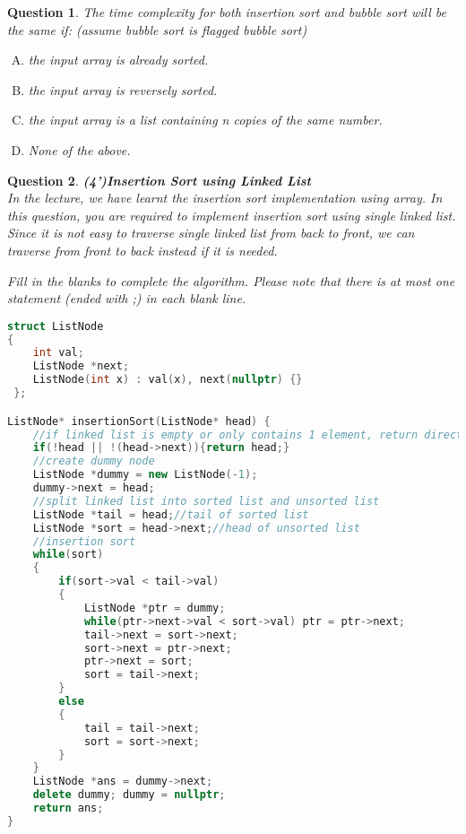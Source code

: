 \documentclass[10.5pt]{article}
\newtheorem{Q}{Question}
\begin{document}
	\begin{Q}
		The time complexity for both insertion sort and bubble sort will be the same if: (assume bubble sort is flagged bubble sort)
		\begin{enumerate}[(A)]
			\item the input array is already sorted.
			\item the input array is reversely sorted.
			\item the input array is a list containing n copies of the same number.
			\item None of the above.
		\end{enumerate}
	\end{Q}
	\vspace{6cm}
	\begin{Q}\textbf{(4')Insertion Sort using Linked List}\\
		 In the lecture, we have learnt the insertion sort implementation using array. In this question, you are required to implement insertion sort using single linked list. Since it is not easy to traverse single linked list from back to front, we can traverse from front to back instead if it is needed.
		 
		 Fill in the blanks to complete the algorithm. Please note that there is at most one statement (ended with ;) in each blank line. 
		 
\hrulefill
\rm{
\begin{lstlisting}[language=C++]
struct ListNode 
{
    int val;
 	ListNode *next;
 	ListNode(int x) : val(x), next(nullptr) {}
 };

ListNode* insertionSort(ListNode* head) {
    //if linked list is empty or only contains 1 element, return directly
    if(!head || !(head->next)){return head;}
    //create dummy node
    ListNode *dummy = new ListNode(-1);
    dummy->next = head;
    //split linked list into sorted list and unsorted list
    ListNode *tail = head;//tail of sorted list
    ListNode *sort = head->next;//head of unsorted list
    //insertion sort
    while(sort)
    {
        if(sort->val < tail->val)
        {
            ListNode *ptr = dummy;
            while(ptr->next->val < sort->val) ptr = ptr->next;
            tail->next = sort->next;
            sort->next = ptr->next;
            ptr->next = sort;
            sort = tail->next;
        }
        else
        {	
            tail = tail->next;
            sort = sort->next;
        }
    }
    ListNode *ans = dummy->next;
    delete dummy; dummy = nullptr;
    return ans;
}
\end{lstlisting}
}
		\vspace{1cm}
	\end{Q}
	
\end{document}
